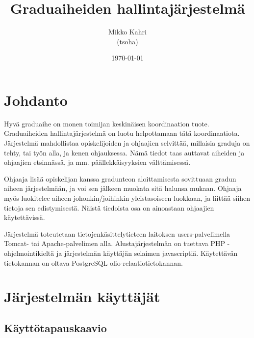 \documentclass[11pt,a4paper,finnish,oneside]{article}
\begin{document}
\begin{titlepage}  
\title{Graduaiheiden hallintajärjestelmä}
\author{Mikko Kahri\\ (tsoha)}
\date{\today}
\maketitle    
\tableofcontents
\end{titlepage}    


\section{Johdanto}

\begin{par}
Hyvä graduaihe on monen toimijan keskinäisen koordinaation tuote. Graduaiheiden hallintajärjestelmä on luotu helpottamaan tätä koordinaatiota. Järjestelmä mahdollistaa opiskelijoiden ja ohjaajien selvittää, millaisia graduja on tehty, tai työn alla, ja kenen ohjauksessa. Nämä tiedot taas auttavat aiheiden ja ohjaajien etsinnässä, ja mm. päällekkäisyyksien välttämisessä.
\end{par}\vspace{1em}

\begin{par}
Ohjaaja lisää opiskelijan kanssa gradunteon aloittamisesta sovittuaan gradun aiheen järjestelmään, ja voi sen jälkeen muokata sitä halunsa mukaan. Ohjaaja myös luokitelee aiheen johonkin/joihinkin yleistasoiseen luokkaan, ja liittää siihen tietoja sen edistymisestä. Näistä tiedoista osa on ainoastaan ohjaajien käytettävissä.
\end{par}\vspace{1em}

\begin{par}
Järjestelmä toteutetaan tietojenkäsittelytieteen laitoksen users-palvelimella Tomcat- tai Apache-palvelimen alla. Alustajärjestelmän on tuettava PHP -ohjelmointikieltä ja järjestelmän käyttäjän selaimen javascriptiä. Käytettävän tietokannan on oltava PostgreSQL olio-relaatiotietokannan.
\end{par}

\section{Järjestelmän käyttäjät}
\subsection{Käyttötapauskaavio}
\end{document}
